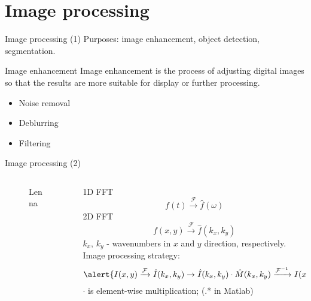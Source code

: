\documentclass[10pt,aspectratio=169]{beamer} %
\begin{document}
\section{Image processing}
\begin{frame}{Image processing (1)}
Purposes: image enhancement, object detection, segmentation.
\begin{block}{Image enhancement}
	Image enhancement is the process of adjusting digital images so that the results are more suitable for display or further processing.
\end{block}
	\begin{itemize}
		\item Noise removal
		\item Deblurring 
		\item Filtering
	\end{itemize}
\end{frame}
\note{}
\begin{frame}{Image processing (2)}
\begin{columns}[T]
	\begin{column}{0.4\textwidth}
		\begin{figure}
			\caption{Lenna}
		\end{figure}
	\end{column}
	\begin{column}{0.6\textwidth}
	1D FFT
	\begin{equation*}
		f(t) \xrightarrow{\mathcal{F}} \hat{f}(\omega)
	\end{equation*}
	2D FFT
	\begin{equation*}
		f(x,y) \xrightarrow{\mathcal{F}} \hat{f}(k_x,k_y)
	\end{equation*}
	\(k_x,\, k_y\) - wavenumbers in \(x\) and \(y\) direction, respectively.\\
	Image processing strategy:
	\begin{equation*}
	\alert{I(x,y) \xrightarrow{\mathcal{F}} \hat{I}(k_x,k_y) \rightarrow \hat{I}(k_x,k_y) \cdot \hat{M}(k_x,k_y)  \xrightarrow{\mathcal{F}^{-1}}  I(x,y)}
	\end{equation*}
	\(\cdot\) is element-wise multiplication; (.* in Matlab)
	\end{column}
	\end{columns}
\end{frame}
\end{document}
